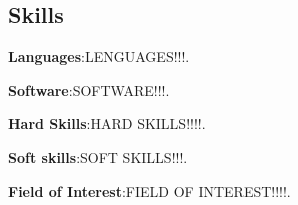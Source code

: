 \documentclass[a4paper, 9pt]{article}
\begin{document}
\subsection*{}
\subsection*{Skills}

\textbf {Languages}:\small LENGUAGES!!!.

\noindent \textbf{Software}:\small SOFTWARE!!!.

\noindent \textbf{Hard Skills}:\small HARD SKILLS!!!!.

\noindent \textbf{Soft skills}:\small SOFT SKILLS!!!.

\noindent \textbf{Field of Interest}:\small FIELD OF INTEREST!!!!.
\end{document}
